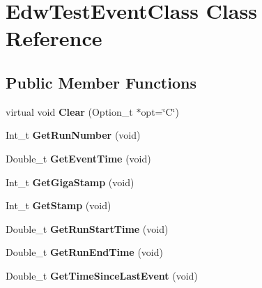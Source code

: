 \hypertarget{class_edw_test_event_class}{
\section{EdwTestEventClass Class Reference}
\label{class_edw_test_event_class}
}
\subsection*{Public Member Functions}
\begin{DoxyCompactItemize}
\item 
\hypertarget{class_edw_test_event_class_a8277b3d3ab413d40d68cee6f13ccac40}{
virtual void {\bfseries Clear} (Option\_\-t $\ast$opt=\char`\"{}C\char`\"{})}
\label{class_edw_test_event_class_a8277b3d3ab413d40d68cee6f13ccac40}

\item 
\hypertarget{class_edw_test_event_class_a5e46bd28bda7d2de3399cb87229f67a6}{
Int\_\-t {\bfseries GetRunNumber} (void)}
\label{class_edw_test_event_class_a5e46bd28bda7d2de3399cb87229f67a6}

\item 
\hypertarget{class_edw_test_event_class_a54138e44c4140cc46f5216682cdc363b}{
Double\_\-t {\bfseries GetEventTime} (void)}
\label{class_edw_test_event_class_a54138e44c4140cc46f5216682cdc363b}

\item 
\hypertarget{class_edw_test_event_class_af4ecc0b26158558d0f201e7afbe53da1}{
Int\_\-t {\bfseries GetGigaStamp} (void)}
\label{class_edw_test_event_class_af4ecc0b26158558d0f201e7afbe53da1}

\item 
\hypertarget{class_edw_test_event_class_ab5d464ae8eb616d0fdaa688832ffe14f}{
Int\_\-t {\bfseries GetStamp} (void)}
\label{class_edw_test_event_class_ab5d464ae8eb616d0fdaa688832ffe14f}

\item 
\hypertarget{class_edw_test_event_class_a14c25be1590dc52a335d57a34c6b1744}{
Double\_\-t {\bfseries GetRunStartTime} (void)}
\label{class_edw_test_event_class_a14c25be1590dc52a335d57a34c6b1744}

\item 
\hypertarget{class_edw_test_event_class_a144dd246324f30d532e57e72dba36441}{
Double\_\-t {\bfseries GetRunEndTime} (void)}
\label{class_edw_test_event_class_a144dd246324f30d532e57e72dba36441}

\item 
\hypertarget{class_edw_test_event_class_ac26df1e33aa4d38262a2ce13eff04cb1}{
Double\_\-t {\bfseries GetTimeSinceLastEvent} (void)}
\label{class_edw_test_event_class_ac26df1e33aa4d38262a2ce13eff04cb1}


\end{DoxyCompactItemize}
